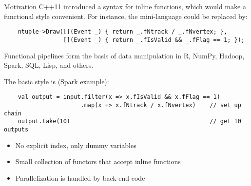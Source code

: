 \documentclass{beamer}
\begin{document}
\begin{frame}[fragile]{Motivation}
C++11 introduced a syntax for inline functions, which would make a functional style convenient. For instance, the mini-language could be replaced by:
{\scriptsize \begin{verbatim}
    ntuple->Draw([](Event _) { return _.fNtrack / _.fNvertex; },
                 [](Event _) { return _.fIsValid && _.fFlag == 1; });
\end{verbatim}}

\vfill
Functional pipelines form the basis of data manipulation in R, NumPy, Hadoop, Spark, SQL, Lisp, and others.

The basic style is (Spark example):
{\scriptsize \begin{verbatim}
    val output = input.filter(x => x.fIsValid && x.fFlag == 1)
                      .map(x => x.fNtrack / x.fNvertex)    // set up chain
    output.take(10)                                        // get 10 outputs
\end{verbatim}}
\begin{itemize}
\item No explicit index, only dummy variables
\item Small collection of functors that accept inline functions
\item Parallelization is handled by back-end code
\end{itemize}
\end{frame}
\end{document}
